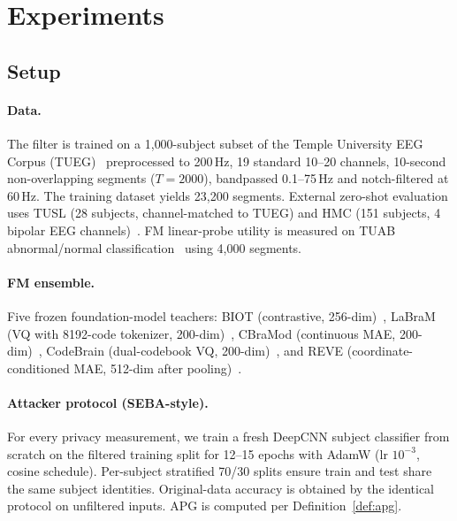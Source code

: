\section{Experiments}
\label{sec:experiments}

\subsection{Setup}
\label{sec:setup}

\paragraph{Data.} The filter is trained on a 1{,}000-subject subset of the Temple University EEG Corpus (TUEG)~\citep{tueg} preprocessed to 200\,Hz, 19 standard 10--20 channels, 10-second non-overlapping segments ($T\!=\!2000$), bandpassed 0.1--75\,Hz and notch-filtered at 60\,Hz. The training dataset yields 23{,}200 segments. External zero-shot evaluation uses TUSL (28 subjects, channel-matched to TUEG) and HMC (151 subjects, 4 bipolar EEG channels)~\citep{hmc_dataset}. FM linear-probe utility is measured on TUAB abnormal/normal classification~\citep{harati2015} using 4{,}000 segments.

\paragraph{FM ensemble.} Five frozen foundation-model teachers: BIOT (contrastive, 256-dim)~\citep{biot}, LaBraM (VQ with 8192-code tokenizer, 200-dim)~\citep{labram}, CBraMod (continuous MAE, 200-dim)~\citep{cbramod}, CodeBrain (dual-codebook VQ, 200-dim)~\citep{codebrain}, and REVE (coordinate-conditioned MAE, 512-dim after pooling)~\citep{reve}.

\paragraph{Attacker protocol (SEBA-style).} For every privacy measurement, we train a fresh DeepCNN subject classifier from scratch on the filtered training split for 12--15 epochs with AdamW (lr $10^{-3}$, cosine schedule). Per-subject stratified 70/30 splits ensure train and test share the same subject identities. Original-data accuracy is obtained by the identical protocol on unfiltered inputs. APG is computed per Definition~\ref{def:apg}.

